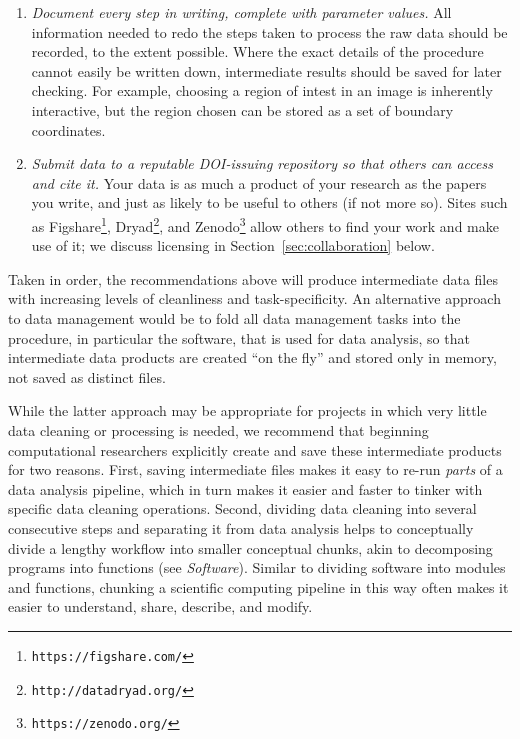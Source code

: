 \documentclass[10pt]{article}
\newcommand{\recommend}[1]{\textit{#1}}
\newcommand{\withurl}[2]{{#1}\footnote{\texttt{#2}}}
\begin{document}
\begin{enumerate}
\item
  \recommend{Document every step in writing, complete with parameter
    values.} All information needed to redo the steps taken to process
  the raw data should be recorded, to the extent possible. Where the
  exact details of the procedure cannot easily be written down,
  intermediate results should be saved for later checking.  For
  example, choosing a region of intest in an image is inherently
  interactive, but the region chosen can be stored as a set of
  boundary coordinates.

\item
  \recommend{Submit data to a reputable DOI-issuing repository so that
    others can access and cite it.}  Your data is as much a product of
  your research as the papers you write, and just as likely to be
  useful to others (if not more so).  Sites such as
  \withurl{Figshare}{https://figshare.com/},
  \withurl{Dryad}{http://datadryad.org/}, and
  \withurl{Zenodo}{https://zenodo.org/} allow others to find your work
  and make use of it; we discuss licensing in
  Section~\ref{sec:collaboration} below.

\end{enumerate}

Taken in order, the recommendations above will produce intermediate
data files with increasing levels of cleanliness and
task-specificity. An alternative approach to data management would be
to fold all data management tasks into the procedure, in particular
the software, that is used for data analysis, so that intermediate
data products are created ``on the fly'' and stored only in memory,
not saved as distinct files.

While the latter approach may be appropriate for projects in which
very little data cleaning or processing is needed, we recommend that
beginning computational researchers explicitly create and save these
intermediate products for two reasons.  First, saving intermediate
files makes it easy to re-run \emph{parts} of a data analysis
pipeline, which in turn makes it easier and faster to tinker with
specific data cleaning operations.  Second, dividing data cleaning
into several consecutive steps and separating it from data analysis
helps to conceptually divide a lengthy workflow into smaller
conceptual chunks, akin to decomposing programs into functions (see
\textit{Software}).  Similar to dividing software into modules and
functions, chunking a scientific computing pipeline in this way often
makes it easier to understand, share, describe, and modify.
\end{document}
